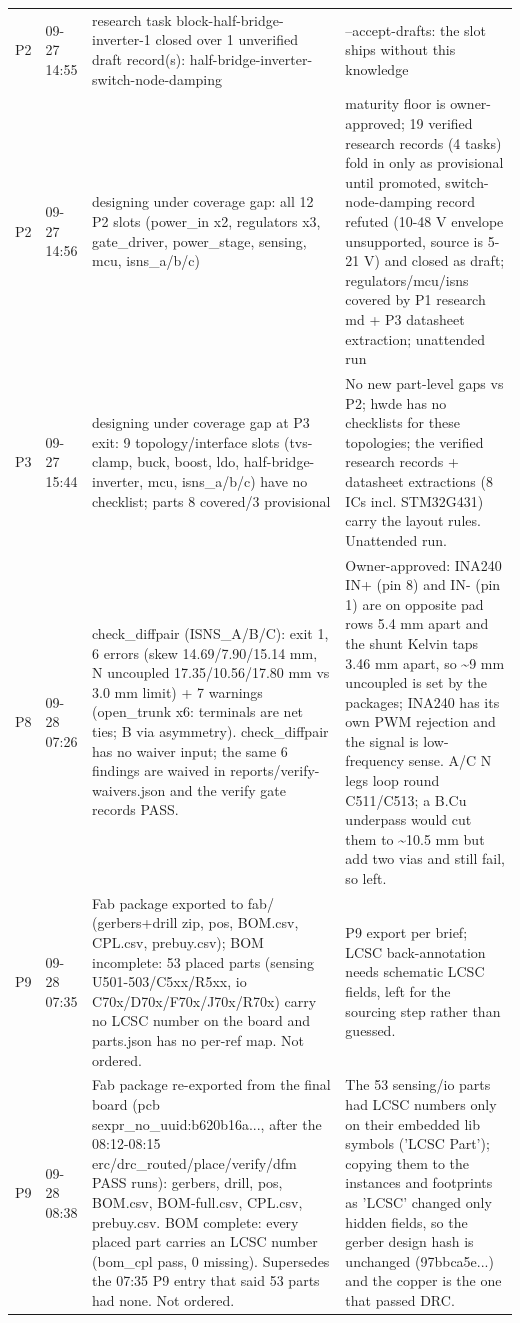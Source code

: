 \documentclass[11pt,a4paper]{article}
\begin{document}
{\begin{longtable}{lp{1.6cm}p{6.2cm}p{6.2cm}}
P2 & 09-27 14:55 & research task block-half-bridge-inverter-1 closed over 1 unverified draft record(s): half-bridge-inverter-switch-node-damping & --accept-drafts: the slot ships without this knowledge \\
P2 & 09-27 14:56 & designing under coverage gap: all 12 P2 slots (power\_in x2, regulators x3, gate\_driver, power\_stage, sensing, mcu, isns\_a/b/c) & maturity floor is owner-approved; 19 verified research records (4 tasks) fold in only as provisional until promoted, switch-node-damping record refuted (10-48 V envelope unsupported, source is 5-21 V) and closed as draft; regulators/mcu/isns covered by P1 research md + P3 datasheet extraction; unattended run \\
P3 & 09-27 15:44 & designing under coverage gap at P3 exit: 9 topology/interface slots (tvs-clamp, buck, boost, ldo, half-bridge-inverter, mcu, isns\_a/b/c) have no checklist; parts 8 covered/3 provisional & No new part-level gaps vs P2; hwde has no checklists for these topologies; the verified research records + datasheet extractions (8 ICs incl. STM32G431) carry the layout rules. Unattended run. \\
P8 & 09-28 07:26 & check\_diffpair (ISNS\_A/B/C): exit 1, 6 errors (skew 14.69/7.90/15.14 mm, N uncoupled 17.35/10.56/17.80 mm vs 3.0 mm limit) + 7 warnings (open\_trunk x6: terminals are net ties; B via asymmetry). check\_diffpair has no waiver input; the same 6 findings are waived in reports/verify-waivers.json and the verify gate records PASS. & Owner-approved: INA240 IN+ (pin 8) and IN- (pin 1) are on opposite pad rows 5.4 mm apart and the shunt Kelvin taps 3.46 mm apart, so \textasciitilde{}9 mm uncoupled is set by the packages; INA240 has its own PWM rejection and the signal is low-frequency sense. A/C N legs loop round C511/C513; a B.Cu underpass would cut them to \textasciitilde{}10.5 mm but add two vias and still fail, so left. \\
P9 & 09-28 07:35 & Fab package exported to fab/ (gerbers+drill zip, pos, BOM.csv, CPL.csv, prebuy.csv); BOM incomplete: 53 placed parts (sensing U501-503/C5xx/R5xx, io C70x/D70x/F70x/J70x/R70x) carry no LCSC number on the board and parts.json has no per-ref map. Not ordered. & P9 export per brief; LCSC back-annotation needs schematic LCSC fields, left for the sourcing step rather than guessed. \\
P9 & 09-28 08:38 & Fab package re-exported from the final board (pcb sexpr\_no\_uuid:b620b16a..., after the 08:12-08:15 erc/drc\_routed/place/verify/dfm PASS runs): gerbers, drill, pos, BOM.csv, BOM-full.csv, CPL.csv, prebuy.csv. BOM complete: every placed part carries an LCSC number (bom\_cpl pass, 0 missing). Supersedes the 07:35 P9 entry that said 53 parts had none. Not ordered. & The 53 sensing/io parts had LCSC numbers only on their embedded lib symbols ('LCSC Part'); copying them to the instances and footprints as 'LCSC' changed only hidden fields, so the gerber design hash is unchanged (97bbca5e...) and the copper is the one that passed DRC. \\
\bottomrule
\end{longtable}
}
\end{document}
